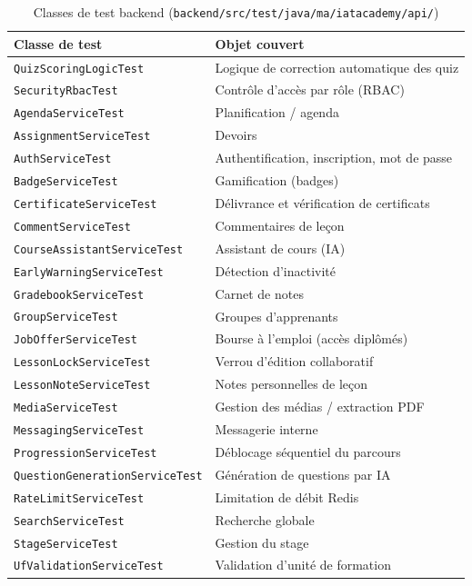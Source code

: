 \begin{table}[H]
  \centering
  \caption{Classes de test backend (\texttt{backend/src/test/java/ma/iatacademy/api/})}
  \label{tab:tests-backend}
  \begin{tabular}{@{}ll@{}}
    \toprule
    Classe de test & Objet couvert \\
    \midrule
    \texttt{QuizScoringLogicTest} & Logique de correction automatique des quiz \\
    \texttt{SecurityRbacTest} & Contrôle d'accès par rôle (RBAC) \\
    \texttt{AgendaServiceTest} & Planification / agenda \\
    \texttt{AssignmentServiceTest} & Devoirs \\
    \texttt{AuthServiceTest} & Authentification, inscription, mot de passe \\
    \texttt{BadgeServiceTest} & Gamification (badges) \\
    \texttt{CertificateServiceTest} & Délivrance et vérification de certificats \\
    \texttt{CommentServiceTest} & Commentaires de leçon \\
    \texttt{CourseAssistantServiceTest} & Assistant de cours (IA) \\
    \texttt{EarlyWarningServiceTest} & Détection d'inactivité \\
    \texttt{GradebookServiceTest} & Carnet de notes \\
    \texttt{GroupServiceTest} & Groupes d'apprenants \\
    \texttt{JobOfferServiceTest} & Bourse à l'emploi (accès diplômés) \\
    \texttt{LessonLockServiceTest} & Verrou d'édition collaboratif \\
    \texttt{LessonNoteServiceTest} & Notes personnelles de leçon \\
    \texttt{MediaServiceTest} & Gestion des médias / extraction PDF \\
    \texttt{MessagingServiceTest} & Messagerie interne \\
    \texttt{ProgressionServiceTest} & Déblocage séquentiel du parcours \\
    \texttt{QuestionGenerationServiceTest} & Génération de questions par IA \\
    \texttt{RateLimitServiceTest} & Limitation de débit Redis \\
    \texttt{SearchServiceTest} & Recherche globale \\
    \texttt{StageServiceTest} & Gestion du stage \\
    \texttt{UfValidationServiceTest} & Validation d'unité de formation \\
    \bottomrule
  \end{tabular}
\end{table}

